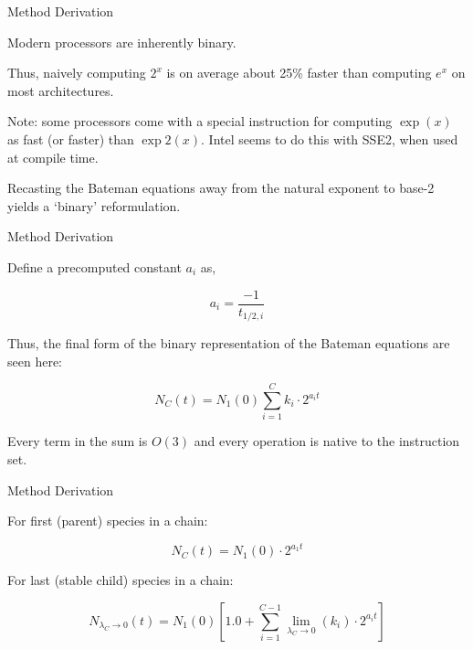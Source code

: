 \documentclass[xcolor=x11names,compress]{beamer}
\begin{document}
\begin{frame}{Method Derivation}

    Modern processors are inherently binary.

    \vspace*{1em}
    Thus, naively computing $2^x$ is on average about 25\% faster than 
    computing $e^x$ on most architectures.

    \vspace*{1em}
    Note: some processors come with a special instruction for computing 
    $\exp(x)$ as fast (or faster) than $\exp2(x)$. Intel seems to do this with 
    SSE2, when used at compile time.

    \vspace*{1em}
    Recasting the Bateman equations away from the natural exponent to base-2
    yields a `binary' reformulation.

\end{frame}


\begin{frame}{Method Derivation}

    Define a precomputed constant $a_i$ as,

    \begin{equation}
    \label{a_i}
    a_i = \frac{-1}{t_{1/2,i}}
    \end{equation}

    \vspace*{1em}
    Thus, the final form of the binary representation of the Bateman equations 
    are seen here:

    \begin{equation}
    \label{nc_wakka}
    N_C(t) = N_1(0) \sum_{i=1}^C k_{i} \cdot 2^{a_i t}
    \end{equation}

    \vspace*{1em}
    Every term in the sum is $O(3)$ and every operation is native to the 
    instruction set.

\end{frame}


\begin{frame}{Method Derivation}

    For first (parent) species in a chain:

\begin{equation}
\label{nc_jawakka}
N_C(t) = N_1(0) \cdot 2^{a_1 t}
\end{equation}

    \vspace*{2em}
    For last (stable child) species in a chain:

\begin{equation}
\label{nc_brown_shoes}
N_{\lambda_C \to 0}(t) = N_1(0) \left[1.0 + \sum_{i=1}^{C-1} \lim_{\lambda_C\to 0}(k_{i}) \cdot 2^{a_i t} \right]
\end{equation}

\end{frame}
\end{document}
